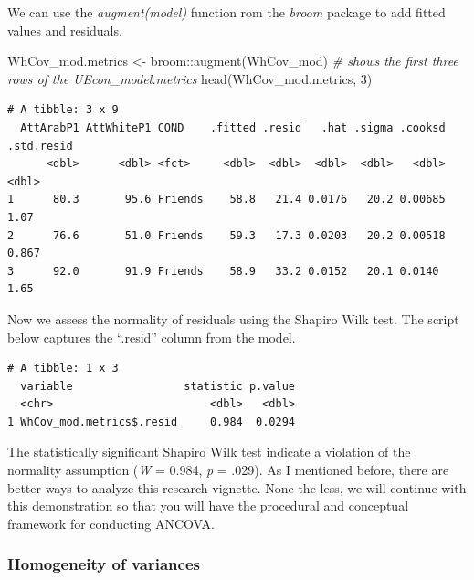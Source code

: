 \documentclass[
  11pt,
]{book}
\newenvironment{Shaded}{\begin{snugshade}}{\end{snugshade}}
\newcommand{\CommentTok}[1]{\textcolor[rgb]{0.56,0.35,0.01}{\textit{#1}}}
\newcommand{\DecValTok}[1]{\textcolor[rgb]{0.00,0.00,0.81}{#1}}
\newcommand{\FunctionTok}[1]{\textcolor[rgb]{0.00,0.00,0.00}{#1}}
\newcommand{\NormalTok}[1]{#1}
\newcommand{\OtherTok}[1]{\textcolor[rgb]{0.56,0.35,0.01}{#1}}
\newcommand{\SpecialCharTok}[1]{\textcolor[rgb]{0.00,0.00,0.00}{#1}}
\begin{document}
We can use the \emph{augment(model)} function rom the \emph{broom} package to add fitted values and residuals.

\begin{Shaded}
\begin{Highlighting}[]
\NormalTok{WhCov\_mod.metrics }\OtherTok{\textless{}{-}}\NormalTok{ broom}\SpecialCharTok{::}\FunctionTok{augment}\NormalTok{(WhCov\_mod)}
\CommentTok{\# shows the first three rows of the UEcon\_model.metrics}
\FunctionTok{head}\NormalTok{(WhCov\_mod.metrics, }\DecValTok{3}\NormalTok{)}
\end{Highlighting}
\end{Shaded}

\begin{verbatim}
# A tibble: 3 x 9
  AttArabP1 AttWhiteP1 COND    .fitted .resid   .hat .sigma .cooksd .std.resid
      <dbl>      <dbl> <fct>     <dbl>  <dbl>  <dbl>  <dbl>   <dbl>      <dbl>
1      80.3       95.6 Friends    58.8   21.4 0.0176   20.2 0.00685      1.07 
2      76.6       51.0 Friends    59.3   17.3 0.0203   20.2 0.00518      0.867
3      92.0       91.9 Friends    58.9   33.2 0.0152   20.1 0.0140       1.65 
\end{verbatim}

Now we assess the normality of residuals using the Shapiro Wilk test. The script below captures the ``.resid'' column from the model.

\begin{Shaded}
\end{Shaded}

\begin{verbatim}
# A tibble: 1 x 3
  variable                 statistic p.value
  <chr>                        <dbl>   <dbl>
1 WhCov_mod.metrics$.resid     0.984  0.0294
\end{verbatim}

The statistically significant Shapiro Wilk test indicate a violation of the normality assumption (\emph{W} = 0.984, \emph{p} = .029). As I mentioned before, there are better ways to analyze this research vignette. None-the-less, we will continue with this demonstration so that you will have the procedural and conceptual framework for conducting ANCOVA.

\hypertarget{homogeneity-of-variances-1}{%
\subsubsection{Homogeneity of variances}\label{homogeneity-of-variances-1}}
\end{document}
